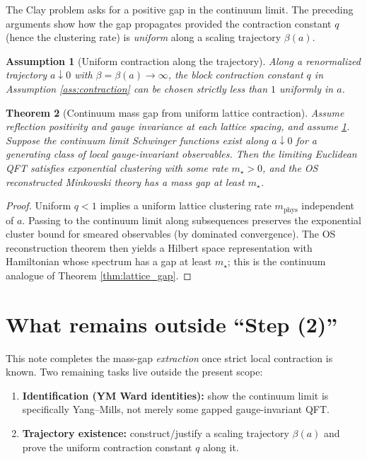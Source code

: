 \documentclass[11pt]{article}
\newtheorem{theorem}{Theorem}[section]
\newtheorem{assumption}[theorem]{Assumption}
\theoremstyle{definition}
\newcommand{\1}{\mathbf{1}}
\begin{document}
The Clay problem asks for a positive gap in the continuum limit. The preceding arguments show how the gap propagates provided the contraction constant $q$ (hence the clustering rate) is \emph{uniform} along a scaling trajectory $\beta(a)$.

\begin{assumption}[Uniform contraction along the trajectory]\label{ass:uniformq}
Along a renormalized trajectory $a\downarrow 0$ with $\beta=\beta(a)\to\infty$, the block contraction constant $q$ in Assumption \ref{ass:contraction} can be chosen strictly less than $1$ uniformly in $a$.
\end{assumption}

\begin{theorem}[Continuum mass gap from uniform lattice contraction]\label{thm:continuum_gap}
Assume reflection positivity and gauge invariance at each lattice spacing, and assume \ref{ass:uniformq}. Suppose the continuum limit Schwinger functions exist along $a\downarrow 0$ for a generating class of local gauge-invariant observables. Then the limiting Euclidean QFT satisfies exponential clustering with some rate $m_\star>0$, and the OS reconstructed Minkowski theory has a mass gap at least $m_\star$.
\end{theorem}

\begin{proof}
Uniform $q<1$ implies a uniform lattice clustering rate $m_{\mathrm{phys}}$ independent of $a$. Passing to the continuum limit along subsequences preserves the exponential cluster bound for smeared observables (by dominated convergence). The OS reconstruction theorem then yields a Hilbert space representation with Hamiltonian whose spectrum has a gap at least $m_\star$; this is the continuum analogue of Theorem \ref{thm:lattice_gap}.
\end{proof}

\section{What remains outside ``Step (2)''}

This note completes the mass-gap \emph{extraction} once strict local contraction is known. Two remaining tasks live outside the present scope:
\begin{enumerate}
\item \textbf{Identification (YM Ward identities):} show the continuum limit is specifically Yang--Mills, not merely some gapped gauge-invariant QFT.
\item \textbf{Trajectory existence:} construct/justify a scaling trajectory $\beta(a)$ and prove the uniform contraction constant $q$ along it.
\end{enumerate}
\end{document}
